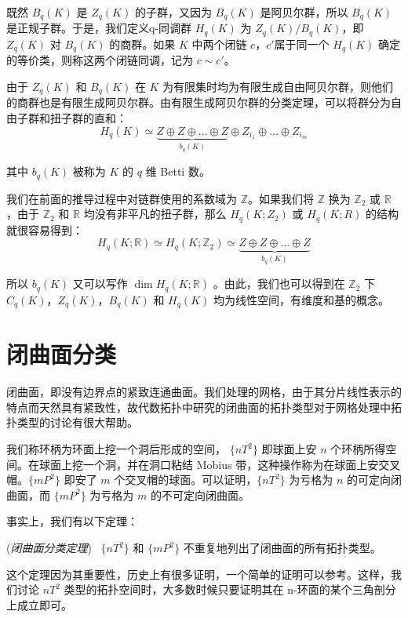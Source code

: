 既然 $ B_q(K) $ 是 $ Z_q(K) $ 的子群，又因为 $ B_q(K) $ 是阿贝尔群，所以 $ B_q(K) $ 是正规子群。于是，我们定义q-同调群 $ H_q(K) $ 为 $ Z_q(K) / B_q(K) $，即 $ Z_q(K) $ 对 $ B_q(K) $ 的商群。如果 $ K $ 中两个闭链 $ c $，$ c' $属于同一个 $ H_q(K) $ 确定的等价类，则称这两个闭链同调，记为 $ c \sim c' $。

由于 $ Z_q(K) $ 和 $ B_q(K) $ 在 $ K $ 为有限集时均为有限生成自由阿贝尔群，则他们的商群也是有限生成阿贝尔群。由有限生成阿贝尔群的分类定理，可以将群分为自由子群和扭子群的直和：
$$
H_q(K) \simeq \underbrace{Z \oplus Z \oplus \dots \oplus Z}_{b_q(K)} \oplus Z_{i_1} \oplus \dots \oplus Z_{i_m}
$$

其中 $ b_q(K) $ 被称为 $ K $ 的 $ q $ 维 Betti 数。

我们在前面的推导过程中对链群使用的系数域为 $ \mathbb Z $。如果我们将 $ \mathbb{Z} $ 换为 $ \mathbb{Z}_2 $ 或 $ \mathbb{R} $，由于 $ \mathbb{Z}_2 $ 和 $ \mathbb{R} $ 均没有非平凡的扭子群，那么 $ H_q(K; Z_2) $ 或 $ H_q(K; R) $ 的结构就很容易得到：
$$
H_q(K;\mathbb{R}) \simeq H_q(K;\mathbb{Z}_2) \simeq\underbrace{Z \oplus Z \oplus \dots \oplus Z}_{b_q(K)}
$$

所以 $ b_q(K) $ 又可以写作 $ \dim H_q(K; \mathbb{R}) $ 。由此，我们也可以得到在 $ \mathbb{Z}_2 $ 下 $ C_q(K) $，$ Z_q(K) $，$ B_q(K) $ 和 $ H_q(K) $ 均为线性空间，有维度和基的概念。

\section{闭曲面分类}

闭曲面，即没有边界点的紧致连通曲面。我们处理的网格，由于其分片线性表示的特点而天然具有紧致性，故代数拓扑中研究的闭曲面的拓扑类型对于网格处理中拓扑类型的讨论有很大帮助。

我们称环柄为环面上挖一个洞后形成的空间， $ \{nT^2\} $ 即球面上安 $ n $ 个环柄所得空间。在球面上挖一个洞，并在洞口粘结 Mobius 带，这种操作称为在球面上安交叉帽。$ \{mP^2\} $ 即安了 $ m $ 个交叉帽的球面。可以证明，$ \{nT^2\} $ 为亏格为 $ n $ 的可定向闭曲面，而 $ \{mP^2\} $ 为亏格为 $ m $ 的不可定向闭曲面。

事实上，我们有以下定理：

\begin{theorem}
    (\emph{闭曲面分类定理})~
    $ \{nT^2 \} $ 和 $ \{mP^2\} $ 不重复地列出了闭曲面的所有拓扑类型。
\end{theorem}

这个定理因为其重要性，历史上有很多证明，一个简单的证明可以参考\cite{jctpxjy}。这样，我们讨论 $ nT^2 $ 类型的拓扑空间时，大多数时候只要证明其在 n-环面的某个三角剖分上成立即可。


